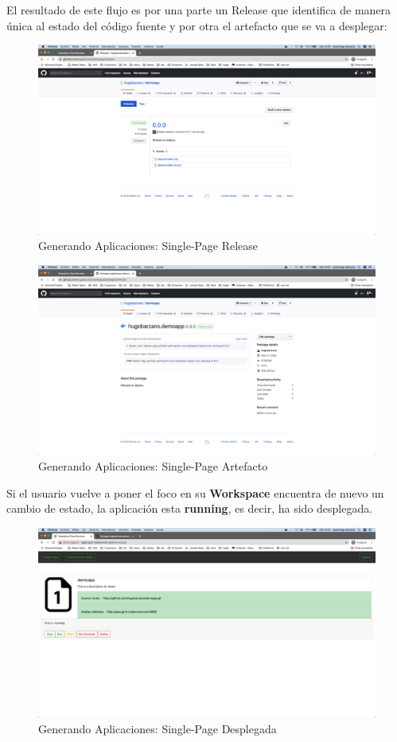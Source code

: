 \documentclass[a4paper,11pt]{book}
\begin{document}
El resultado de este flujo es por una parte un Release que identifica de manera única al estado del código fuente y por otra el artefacto que se va a desplegar: 

\begin{figure}[H]
\centering
\includegraphics[scale=0.2]{imagenes/casouso/14.png}
\caption{ Generando Aplicaciones: Single-Page Release  }
\end{figure}

\begin{figure}[H]
\centering
\includegraphics[scale=0.2]{imagenes/casouso/15.png}
\caption{  Generando Aplicaciones: Single-Page Artefacto}
\end{figure}

Si el usuario vuelve a poner el foco en su \textbf{Workspace} encuentra de nuevo un cambio de estado, la aplicación esta \textbf{running}, es decir, ha sido desplegada. 
\begin{figure}[H]
\centering
\includegraphics[scale=0.2]{imagenes/casouso/16.png}
\caption{   Generando Aplicaciones: Single-Page Desplegada }
\end{figure}
\end{document}
